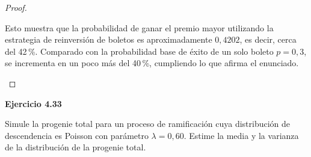 \documentclass{article}
\begin{document}
\begin{proof}
\begin{itemize}
Esto muestra que la probabilidad de ganar el premio mayor utilizando la estrategia de reinversión de boletos es aproximadamente \( 0{,}4202 \), es decir, cerca del 42\,\%. Comparado con la probabilidad base de éxito de un solo boleto \( p = 0{,}3 \), se incrementa en un poco más del 40\,\%, cumpliendo lo que afirma el enunciado.

\end{itemize}
\end{proof}


\textbf{Ejercicio 4.33}

Simule la progenie total para un proceso de ramificación cuya distribución de descendencia es Poisson con parámetro \( \lambda = 0{,}60 \). Estime la media y la varianza de la distribución de la progenie total.
\end{document}
